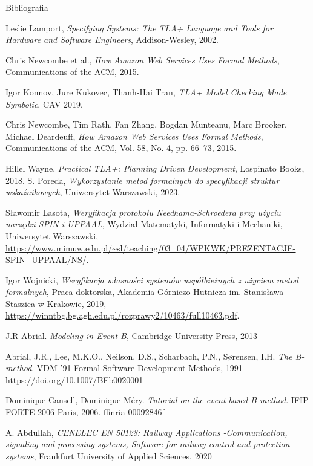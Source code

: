 \documentclass{beamer}
\begin{document}
\begin{frame}{Bibliografia}
  \scriptsize
  \begin{thebibliography}{9}
  
    Leslie Lamport, \emph{Specifying Systems: The TLA+ Language and Tools for Hardware and Software Engineers}, Addison-Wesley, 2002.
  
    Chris Newcombe et al., \emph{How Amazon Web Services Uses Formal Methods}, Communications of the ACM, 2015.
  
    Igor Konnov, Jure Kukovec, Thanh-Hai Tran, \emph{TLA+ Model Checking Made Symbolic}, CAV 2019.
    
    Chris Newcombe, Tim Rath, Fan Zhang, Bogdan Munteanu, Marc Brooker, Michael Deardeuff, \emph{How Amazon Web Services Uses Formal Methods}, Communications of the ACM, Vol. 58, No. 4, pp. 66--73, 2015.


    Hillel Wayne, \emph{Practical TLA+: Planning Driven Development}, Lospinato Books, 2018.
    S. Poreda,
    \textit{Wykorzystanie metod formalnych do specyfikacji struktur wskaźnikowych},
    Uniwersytet Warszawski, 2023.

    Sławomir Lasota,
    \textit{Weryfikacja protokołu Needhama-Schroedera przy użyciu narzędzi SPIN i UPPAAL},
    Wydział Matematyki, Informatyki i Mechaniki, Uniwersytet Warszawski,
    \url{https://www.mimuw.edu.pl/~sl/teaching/03_04/WPKWK/PREZENTACJE-SPIN_UPPAAL/NS/}.

    Igor Wojnicki,
    \textit{Weryfikacja własności systemów współbieżnych z użyciem metod formalnych},
    Praca doktorska, Akademia Górniczo-Hutnicza im. Stanisława Staszica w Krakowie, 2019,
    \url{https://winntbg.bg.agh.edu.pl/rozprawy2/10463/full10463.pdf}.

J.R Abrial. \emph{Modeling in Event-B}, Cambridge University Press, 2013

Abrial, J.R., Lee, M.K.O., Neilson, D.S., Scharbach, P.N., Sørensen, I.H. \emph{The B-method}. VDM '91 Formal Software Development Methods, 1991 https://doi.org/10.1007/BFb0020001

Dominique Cansell, Dominique Méry. \emph{Tutorial on the event-based B method}. IFIP FORTE 2006
Paris, 2006. ffinria-00092846f

A. Abdullah, \emph{CENELEC EN 50128: Railway Applications -Communication, signaling and processing systems, Software for railway control and protection systems}, Frankfurt University of Applied Sciences, 2020
        
  \end{thebibliography}
\end{frame}
\end{document}
